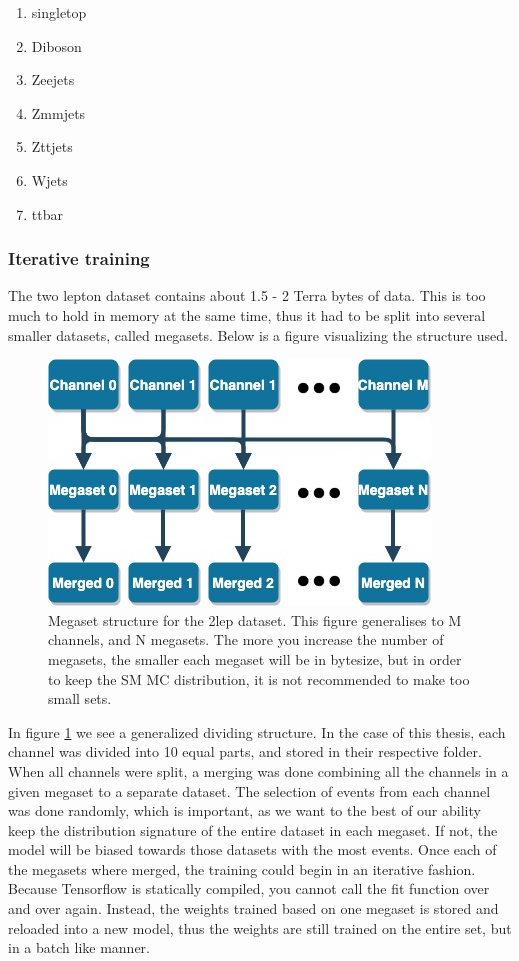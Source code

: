 \begin{enumerate}
    \item singletop 
    \item Diboson 
    \item Zeejets 
    \item Zmmjets 
    \item Zttjets 
    \item Wjets 
    \item ttbar
   
\end{enumerate}

 
\subsubsection*{Iterative training}
The two lepton dataset contains about 1.5 - 2 Terra bytes of data. This is too much to hold in memory at the same time, thus it had to be split into 
several smaller datasets, called megasets. Below is a figure visualizing the structure used. 

\begin{figure}[h!]
    \centering
    \includegraphics[width=0.6\linewidth]{Figures/2lep_config/megaset_struct.jpeg}
    \caption{Megaset structure for the 2lep dataset. This figure generalises to M channels, and N megasets. The more you increase the number of megasets, 
    the smaller each megaset will be in bytesize, but in order to keep the SM MC distribution, it is not recommended to make too small sets.  }
    \label{fig:2lep_struct}
\end{figure}




In figure \ref{fig:2lep_struct} we see a generalized dividing structure. In the case of this thesis, each channel was divided into 10 equal parts, 
and stored in their respective folder. When all channels were 
split, a merging was done combining all the channels in a given megaset to a separate dataset. The selection of events from each channel was done randomly, 
which is important, as we want to the best of our ability keep the distribution signature of the entire dataset in each megaset. If not, the model will 
be biased towards those datasets with the most events. Once each of the megasets where merged, the training could begin in an iterative fashion. Because
Tensorflow is statically compiled, you cannot call the fit function over and over again. Instead, the weights trained based on one megaset is stored and 
reloaded into a new model, thus the weights are still trained on the entire set, but in a batch like manner. 

